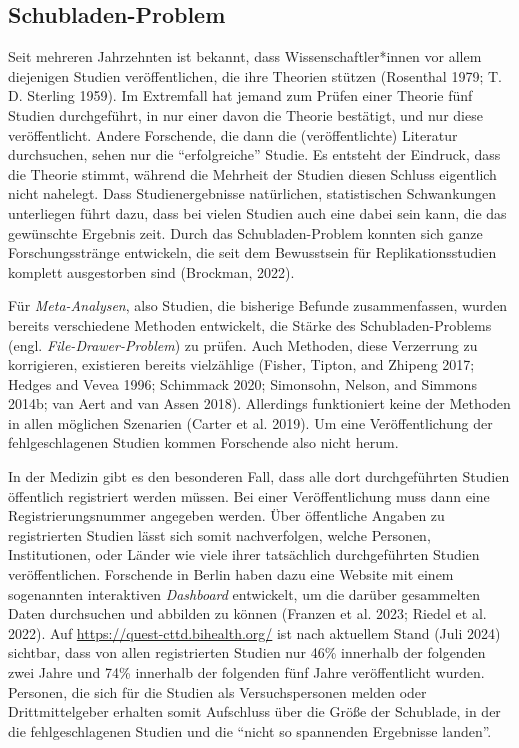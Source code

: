 \documentclass[
  letterpaper,
  DIV=11,
  numbers=noendperiod]{scrreprt}
\begin{document}
\subsection{Schubladen-Problem}\label{schubladen-problem}

Seit mehreren Jahrzehnten ist bekannt, dass Wissenschaftler*innen vor
allem diejenigen Studien veröffentlichen, die ihre Theorien stützen
(Rosenthal 1979; T. D. Sterling 1959). Im Extremfall hat jemand zum
Prüfen einer Theorie fünf Studien durchgeführt, in nur einer davon die
Theorie bestätigt, und nur diese veröffentlicht. Andere Forschende, die
dann die (veröffentlichte) Literatur durchsuchen, sehen nur die
``erfolgreiche'' Studie. Es entsteht der Eindruck, dass die Theorie
stimmt, während die Mehrheit der Studien diesen Schluss eigentlich nicht
nahelegt. Dass Studienergebnisse natürlichen, statistischen Schwankungen
unterliegen führt dazu, dass bei vielen Studien auch eine dabei sein
kann, die das gewünschte Ergebnis zeit. Durch das Schubladen-Problem
konnten sich ganze Forschungsstränge entwickeln, die seit dem
Bewusstsein für Replikationsstudien komplett ausgestorben sind
(Brockman, 2022).

Für \emph{Meta-Analysen}, also Studien, die bisherige Befunde
zusammenfassen, wurden bereits verschiedene Methoden entwickelt, die
Stärke des Schubladen-Problems (engl. \emph{File-Drawer-Problem}) zu
prüfen. Auch Methoden, diese Verzerrung zu korrigieren, existieren
bereits vielzählige (Fisher, Tipton, and Zhipeng 2017; Hedges and Vevea
1996; Schimmack 2020; Simonsohn, Nelson, and Simmons 2014b; van Aert and
van Assen 2018). Allerdings funktioniert keine der Methoden in allen
möglichen Szenarien (Carter et al. 2019). Um eine Veröffentlichung der
fehlgeschlagenen Studien kommen Forschende also nicht herum.

In der Medizin gibt es den besonderen Fall, dass alle dort
durchgeführten Studien öffentlich registriert werden müssen. Bei einer
Veröffentlichung muss dann eine Registrierungsnummer angegeben werden.
Über öffentliche Angaben zu registrierten Studien lässt sich somit
nachverfolgen, welche Personen, Institutionen, oder Länder wie viele
ihrer tatsächlich durchgeführten Studien veröffentlichen. Forschende in
Berlin haben dazu eine Website mit einem sogenannten interaktiven
\emph{Dashboard} entwickelt, um die darüber gesammelten Daten
durchsuchen und abbilden zu können (Franzen et al. 2023; Riedel et al.
2022). Auf \url{https://quest-cttd.bihealth.org/} ist nach aktuellem
Stand (Juli 2024) sichtbar, dass von allen registrierten Studien nur
46\% innerhalb der folgenden zwei Jahre und 74\% innerhalb der folgenden
fünf Jahre veröffentlicht wurden. Personen, die sich für die Studien als
Versuchspersonen melden oder Drittmittelgeber erhalten somit Aufschluss
über die Größe der Schublade, in der die fehlgeschlagenen Studien und
die ``nicht so spannenden Ergebnisse landen''.
\end{document}
